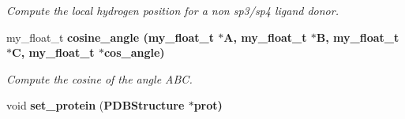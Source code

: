 \begin{CompactItemize}
\begin{CompactList}\small\item\em Compute the local hydrogen position for a non sp3/sp4 ligand donor. \item\end{CompactList}\item 
my\_\-float\_\-t \bf{cosine\_\-angle} (my\_\-float\_\-t $\ast$A, my\_\-float\_\-t $\ast$B, my\_\-float\_\-t $\ast$C, my\_\-float\_\-t $\ast$cos\_\-angle)\label{classASCbase_1_1HbondGeometry_f331b8cf86d1b6d75a1d9002cc728cde}

\begin{CompactList}\small\item\em Compute the cosine of the angle ABC. \item\end{CompactList}\item 
void \textbf{set\_\-protein} (\bf{PDBStructure} $\ast$prot)\label{classASCbase_1_1HbondGeometry_cffbb708f35a814d4cfd8102b8f4d19c}

\end{CompactItemize}
